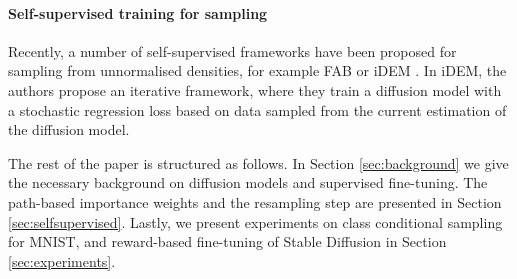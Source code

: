 \paragraph{Self-supervised training for sampling} Recently, a number of self-supervised frameworks have been proposed for sampling from unnormalised densities, for example FAB \citep{midgley2022flow} or iDEM \citep{akhound2024iterated}. In iDEM, the authors propose an iterative framework, where they train a diffusion model with a stochastic regression loss based on data sampled from the current estimation of the diffusion model.  

The rest of the paper is structured as follows. In Section \ref{sec:background} we give the necessary background on diffusion models and supervised fine-tuning. The path-based importance weights and the resampling step are presented in Section \ref{sec:selfsupervised}. Lastly, we present experiments on class conditional sampling for MNIST, and reward-based fine-tuning of Stable Diffusion \citep{rombach2022high} in Section \ref{sec:experiments}.